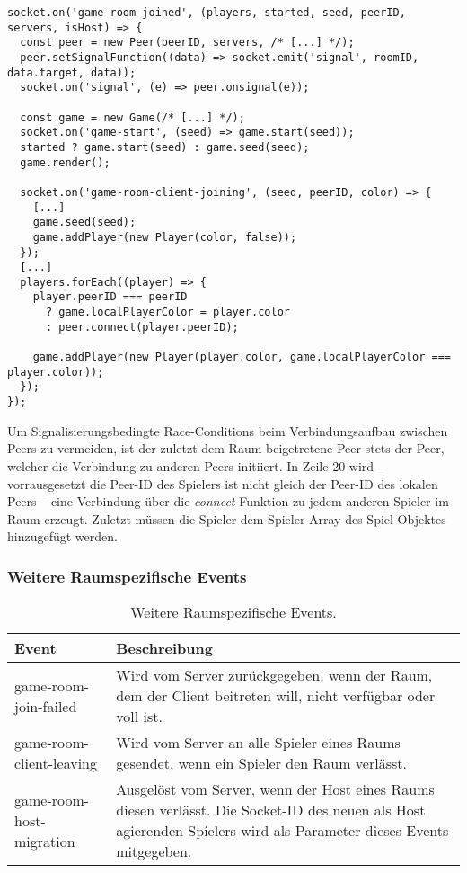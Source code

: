 \vspace{11pt}
\lstset{language=js, style=STYLE_CODE_JS}
\begin{singlespace}
\begin{lstlisting}[caption={Raumbeitritt auf der Client-Seite -- game.js}, captionpos=b, label={lst:clientroomjoin}]
socket.on('game-room-joined', (players, started, seed, peerID, servers, isHost) => {
  const peer = new Peer(peerID, servers, /* [...] */);
  peer.setSignalFunction((data) => socket.emit('signal', roomID, data.target, data)); 
  socket.on('signal', (e) => peer.onsignal(e));

  const game = new Game(/* [...] */);
  socket.on('game-start', (seed) => game.start(seed));
  started ? game.start(seed) : game.seed(seed);
  game.render();

  socket.on('game-room-client-joining', (seed, peerID, color) => {
	[...]
    game.seed(seed);
    game.addPlayer(new Player(color, false));
  });
  [...]
  players.forEach((player) => {
    player.peerID === peerID 
      ? game.localPlayerColor = player.color 
      : peer.connect(player.peerID);
      
    game.addPlayer(new Player(player.color, game.localPlayerColor === player.color));
  });
});
\end{lstlisting}
\end{singlespace}

Um Signalisierungsbedingte \glqq{}Race-Conditions\grqq{} beim Verbindungsaufbau zwischen Peers zu vermeiden, ist der zuletzt dem Raum beigetretene Peer stets der Peer, welcher die Verbindung zu anderen Peers initiiert. In Zeile 20 wird -- vorrausgesetzt die Peer-ID des Spielers ist nicht gleich der Peer-ID des lokalen Peers -- eine Verbindung über die \textit{connect}-Funktion zu jedem anderen Spieler im Raum erzeugt. Zuletzt müssen die Spieler dem Spieler-Array des Spiel-Objektes hinzugefügt werden.

\subsubsection{Weitere Raumspezifische Events}
\begin{table}[ht]
\centering
\begin{tabularx}{\textwidth}{lX}
\toprule
Event&Beschreibung\\

\midrule
game-room-join-failed&Wird vom Server zurückgegeben, wenn der Raum, dem der Client beitreten will, nicht verfügbar oder voll ist.\\
game-room-client-leaving&Wird vom Server an alle Spieler eines Raums gesendet, wenn ein Spieler den Raum verlässt.\\
game-room-host-migration&Ausgelöst vom Server, wenn der Host eines Raums diesen verlässt. Die Socket-ID des neuen als Host agierenden Spielers wird als Parameter dieses Events mitgegeben.\\
\bottomrule

\end{tabularx}
\caption{Weitere Raumspezifische Events.}
\label{table:otherevents}
\end{table}

